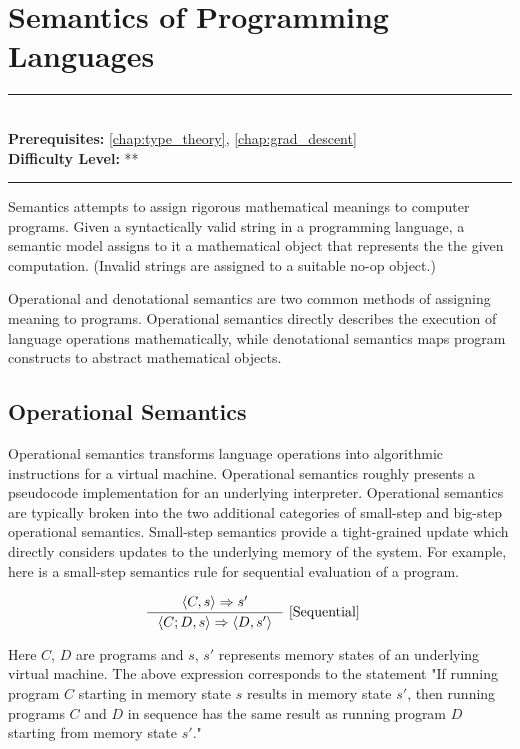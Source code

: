 \documentclass[book.tex]{subfiles}
\begin{document}
\chapter{Semantics of Programming Languages}

\label{chap:transformer}
\noindent\rule{11cm}{0.4pt} \\
\textbf{Prerequisites:}  \autoref{chap:type_theory}, \autoref{chap:grad_descent}  \\
\textbf{Difficulty Level:} ** \\
\noindent\rule{11cm}{0.4pt}
\vspace{5mm}

Semantics attempts to assign rigorous mathematical meanings to computer programs. Given a syntactically valid string in a programming language, a semantic model assigns to it a mathematical object that represents the the given computation. (Invalid strings are assigned to a suitable no-op object.)

Operational and denotational semantics are two common methods of assigning meaning to programs. Operational semantics directly describes the execution of language operations mathematically, while denotational semantics maps program constructs to abstract mathematical objects.

\section{Operational Semantics}

Operational semantics transforms language operations into algorithmic instructions for a virtual machine. Operational semantics roughly presents a pseudocode implementation for an underlying interpreter. Operational semantics are typically broken into the two additional categories of small-step and big-step operational semantics. Small-step semantics provide a tight-grained update which directly considers updates to the underlying memory of the system. For example, here is a small-step semantics rule for sequential evaluation of a program. 

\begin{alignat*}{2}
    &\inference[]
    {
     \langle C, s \rangle \Rightarrow s'
    }
    {
    \langle C; D, s \rangle \Rightarrow \langle D, s' \rangle 
    } \ \textrm{[Sequential]} 
\end{alignat*}

Here $C$, $D$ are programs and $s$, $s'$ represents memory states of an underlying virtual machine. The above expression corresponds to the statement "If running program $C$ starting in memory state $s$ results in memory state $s'$, then running programs $C$ and $D$ in sequence has the same result as running program $D$ starting from memory state $s'$."
\end{document}
